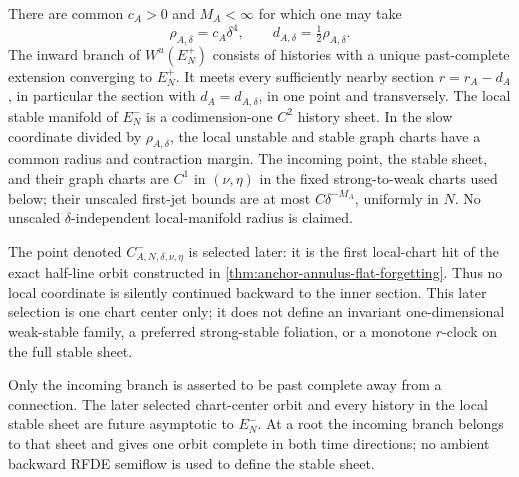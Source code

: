 \begin{theorem}
There are common \(c_A>0\) and \(M_A<\infty\) for which one may take
\begin{equation}
 \rho_{A,\delta}=c_A\delta^4,
 \qquad d_{A,\delta}=\tfrac12\rho_{A,\delta}.       \label{eq:anchor-local-manifold-scale}
\end{equation}
The inward branch of \(W^u(E_N^+)\) consists of histories with a unique
past-complete extension converging to \(E_N^+\).  It meets every sufficiently
nearby section \(r=r_A-d_A\), in particular the section with
\(d_A=d_{A,\delta}\), in one point and transversely.
The local stable manifold of \(E_N^-\) is a codimension-one
\(C^2\) history sheet.  In the slow coordinate divided by
\(\rho_{A,\delta}\), the local unstable and stable graph charts have a
common radius and contraction margin.  The incoming point, the stable
sheet, and their graph charts are \(C^1\) in \((\nu,\eta)\) in the
fixed strong-to-weak charts used below; their unscaled first-jet bounds are
at most \(C\delta^{-M_A}\), uniformly in \(N\).  No unscaled
\(\delta\)-independent local-manifold radius is claimed.

The point denoted \(C^-_{A,N,\delta,\nu,\eta}\) is selected later: it is
the first local-chart hit of the exact half-line orbit constructed in
\cref{thm:anchor-annulus-flat-forgetting}.  Thus no local coordinate is
silently continued backward to the inner section.  This later selection is
one chart center only; it does not define an invariant one-dimensional
weak-stable family, a preferred strong-stable foliation, or a monotone
\(r\)-clock on the full stable sheet.

Only the incoming branch is asserted to be past complete away from a
connection.  The later selected chart-center orbit and every history in the
local stable sheet are future asymptotic to \(E_N^-\).  At a root the incoming
branch belongs to that sheet and gives one orbit complete in both time
directions; no ambient backward RFDE semiflow is used to define the stable
sheet.
\end{theorem}

